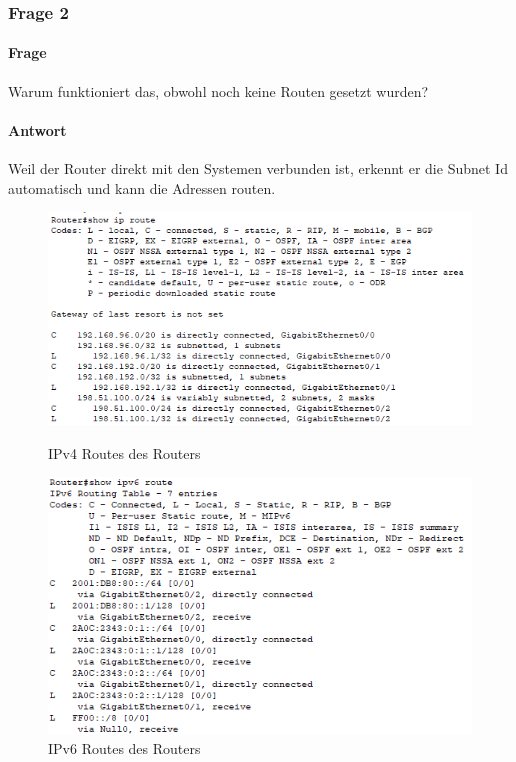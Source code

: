 \subsubsection{Frage 2}
\paragraph{Frage}
Warum funktioniert das, obwohl noch keine Routen gesetzt wurden?
\paragraph{Antwort}
Weil der Router direkt mit den Systemen verbunden ist, erkennt er die Subnet Id automatisch und kann die Adressen routen.
\begin{figure}[!htb]
    \centering
    \includegraphics[width=\textwidth,height=.4\textwidth,keepaspectratio]{./img/config/ip_route.png}
    \caption{IPv4 Routes des Routers}
    \includegraphics[width=\textwidth,height=.5\textwidth,keepaspectratio]{./img/config/ipv6_route.png}
    \caption{IPv6 Routes des Routers}
\end{figure}